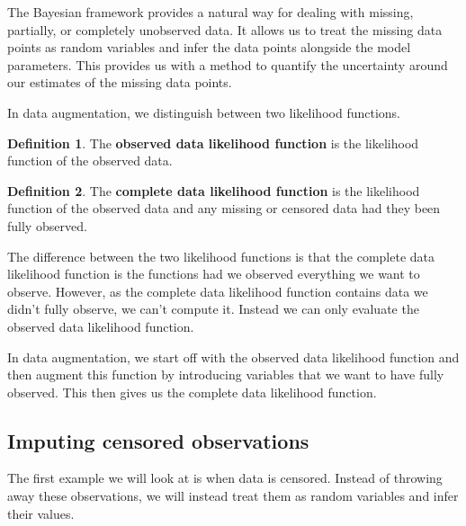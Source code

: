 \documentclass[
]{book}
\theoremstyle{definition}
\newtheorem{definition}{Definition}[chapter]
\theoremstyle{definition}
\theoremstyle{definition}
\theoremstyle{definition}
\theoremstyle{remark}
\begin{document}
The Bayesian framework provides a natural way for dealing with missing, partially, or completely unobserved data. It allows us to treat the missing data points as random variables and infer the data points alongside the model parameters. This provides us with a method to quantify the uncertainty around our estimates of the missing data points.

In data augmentation, we distinguish between two likelihood functions.

\begin{definition}
The \textbf{observed data likelihood function} is the likelihood function of the observed data.
\end{definition}

\begin{definition}
The \textbf{complete data likelihood function} is the likelihood function of the observed data and any missing or censored data had they been fully observed.
\end{definition}

The difference between the two likelihood functions is that the complete data likelihood function is the functions had we observed everything we want to observe. However, as the complete data likelihood function contains data we didn't fully observe, we can't compute it. Instead we can only evaluate the observed data likelihood function.

In data augmentation, we start off with the observed data likelihood function and then augment this function by introducing variables that we want to have fully observed. This then gives us the complete data likelihood function.

\hypertarget{imputing-censored-observations}{%
\subsection{Imputing censored observations}\label{imputing-censored-observations}}

The first example we will look at is when data is censored. Instead of throwing away these observations, we will instead treat them as random variables and infer their values.
\end{document}
